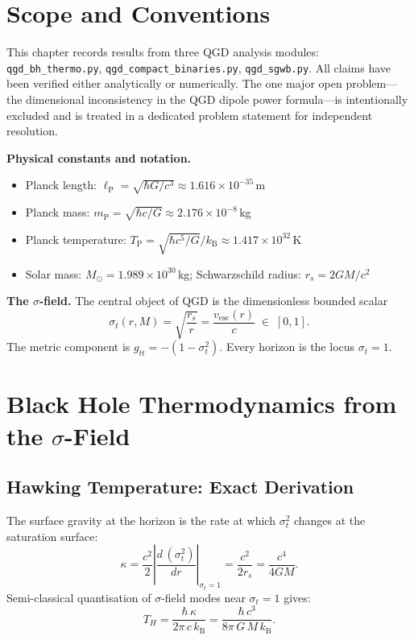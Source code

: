 \documentclass[12pt,a4paper]{article}
\newcommand{\lP}{\ell_{\mathrm{P}}}
\newcommand{\mP}{m_{\mathrm{P}}}
\newcommand{\Msun}{M_{\odot}}
\begin{document}
\tableofcontents
\newpage

\section{Scope and Conventions}

This chapter records results from three QGD analysis modules:
\texttt{qgd\_bh\_thermo.py}, \texttt{qgd\_compact\_binaries.py},
\texttt{qgd\_sgwb.py}.
All claims have been verified either analytically or numerically.
The one major open problem---the dimensional inconsistency in the QGD
dipole power formula---is intentionally excluded and is treated in a
dedicated problem statement for independent resolution.

\medskip\noindent\textbf{Physical constants and notation.}
\begin{itemize}[noitemsep]
  \item Planck length: $\lP = \sqrt{\hbar G/c^3} \approx 1.616\times10^{-35}\,$m
  \item Planck mass:   $\mP = \sqrt{\hbar c/G}   \approx 2.176\times10^{-8}\,$kg
  \item Planck temperature: $T_{\mathrm{P}} = \sqrt{\hbar c^5/G}/k_{\mathrm{B}} \approx 1.417\times10^{32}\,$K
  \item Solar mass: $\Msun = 1.989\times10^{30}\,$kg; \quad Schwarzschild radius: $r_s = 2GM/c^2$
\end{itemize}

\medskip\noindent\textbf{The $\sigma$-field.}
The central object of QGD is the dimensionless bounded scalar
\begin{equation}
  \sigma_t(r,M) = \sqrt{\frac{r_s}{r}} = \frac{v_{\mathrm{esc}}(r)}{c}\;\in\;[0,1].
\end{equation}
The metric component is $g_{tt} = -(1-\sigma_t^2)$.
Every horizon is the locus $\sigma_t = 1$.

\section{Black Hole Thermodynamics from the $\sigma$-Field}

\subsection{Hawking Temperature: Exact Derivation}

\begin{result}
The surface gravity at the horizon is the rate at which $\sigma_t^2$
changes at the saturation surface:
\begin{equation}
  \kappa
  = \frac{c^2}{2}\left|\frac{d\,(\sigma_t^2)}{dr}\right|_{\!\sigma_t=1}
  = \frac{c^2}{2r_s}
  = \frac{c^4}{4GM}.
\end{equation}
Semi-classical quantisation of $\sigma$-field modes near $\sigma_t = 1$ gives:
\begin{equation}
  \boxed{T_H = \frac{\hbar\,\kappa}{2\pi\,c\,k_{\mathrm{B}}}
             = \frac{\hbar\,c^3}{8\pi\,G\,M\,k_{\mathrm{B}}}.}
\end{equation}
\end{result}
\end{document}
